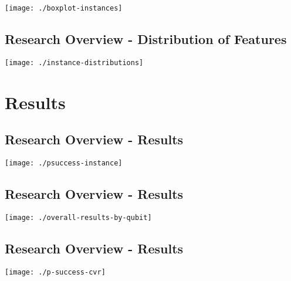 \documentclass[
]{article}
\begin{document}
\begin{center}\texttt{[image: ./boxplot-instances]} \end{center}

\hypertarget{research-overview---distribution-of-features-1}{%
\subsection{Research Overview - Distribution of
Features}\label{research-overview---distribution-of-features-1}}

\begin{center}\texttt{[image: ./instance-distributions]} \end{center}

\hypertarget{results}{%
\section{Results}\label{results}}

\hypertarget{research-overview---results}{%
\subsection{Research Overview -
Results}\label{research-overview---results}}

\begin{center}\texttt{[image: ./psuccess-instance]} \end{center}

\hypertarget{research-overview---results-1}{%
\subsection{Research Overview -
Results}\label{research-overview---results-1}}

\begin{center}\texttt{[image: ./overall-results-by-qubit]} \end{center}

\hypertarget{research-overview---results-2}{%
\subsection{Research Overview -
Results}\label{research-overview---results-2}}

\begin{center}\texttt{[image: ./p-success-cvr]} \end{center}
\end{document}
